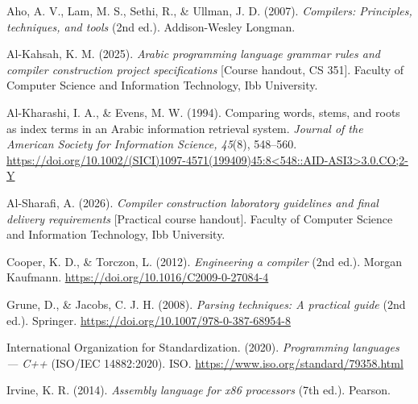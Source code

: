 \documentclass[12pt,a4paper]{report}
\begin{document}
\setlength{\leftskip}{1.5cm}
\setlength{\parindent}{-1.5cm}

Aho, A. V., Lam, M. S., Sethi, R., \& Ullman, J. D. (2007). \textit{Compilers: Principles, techniques, and tools} (2nd ed.). Addison-Wesley Longman.

\vspace{0.3cm}

Al-Kahsah, K. M. (2025). \textit{Arabic programming language grammar rules and compiler construction project specifications} [Course handout, CS 351]. Faculty of Computer Science and Information Technology, Ibb University.

\vspace{0.3cm}

Al-Kharashi, I. A., \& Evens, M. W. (1994). Comparing words, stems, and roots as index terms in an Arabic information retrieval system. \textit{Journal of the American Society for Information Science, 45}(8), 548--560. \url{https://doi.org/10.1002/(SICI)1097-4571(199409)45:8<548::AID-ASI3>3.0.CO;2-Y}

\vspace{0.3cm}

Al-Sharafi, A. (2026). \textit{Compiler construction laboratory guidelines and final delivery requirements} [Practical course handout]. Faculty of Computer Science and Information Technology, Ibb University.

\vspace{0.3cm}

Cooper, K. D., \& Torczon, L. (2012). \textit{Engineering a compiler} (2nd ed.). Morgan Kaufmann. \url{https://doi.org/10.1016/C2009-0-27084-4}

\vspace{0.3cm}

Grune, D., \& Jacobs, C. J. H. (2008). \textit{Parsing techniques: A practical guide} (2nd ed.). Springer. \url{https://doi.org/10.1007/978-0-387-68954-8}

\vspace{0.3cm}

International Organization for Standardization. (2020). \textit{Programming languages --- C++} (ISO/IEC 14882:2020). ISO. \url{https://www.iso.org/standard/79358.html}

\vspace{0.3cm}

Irvine, K. R. (2014). \textit{Assembly language for x86 processors} (7th ed.). Pearson.

\vspace{0.3cm}
\end{document}
